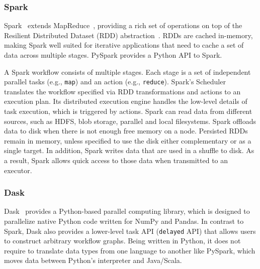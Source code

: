 
\subsubsection*{Spark}

Spark~\cite{zaharia2010spark} extends MapReduce~\cite{dean2004mapreduce},
providing a rich set of operations on top of the Resilient Distributed Dataset
(RDD) abstraction~\cite{zaharia2012resilient}. RDDs are cached in-memory, making
Spark well suited for iterative applications that need to cache a set of data
across multiple stages. PySpark provides a Python API to Spark.

A Spark workflow consists of multiple stages. Each stage is a set of independent
parallel tasks (e.g., \texttt{map}) and an action (e.g., \texttt{reduce}).
Spark's Scheduler translates the workflow specified via RDD transformations and
actions to an execution plan. Its distributed execution engine handles the
low-level details of task execution, which is triggered by actions. Spark can
read data from different sources, such as HDFS, blob storage, parallel and local
filesystems. Spark offloads data to disk when there is not enough free memory
on a node. Persisted RDDs remain in memory,
unless specified to use the disk either complementary or as a single target. In
addition, Spark writes data that are used in a shuffle to disk. As a result, Spark
allows quick access to those data when transmitted to an executor.

\subsubsection*{Dask}

Dask~\cite{rocklin2015dask} provides a Python-based parallel computing library,
which is designed to parallelize native Python code written for NumPy and
Pandas. In contrast to Spark, Dask also provides a lower-level task API
(\texttt{delayed} API) that allows users to construct arbitrary workflow graphs.
Being written in Python, it does not require to translate data types from one
language to another like PySpark, which moves data between Python's interpreter
and Java/Scala.


